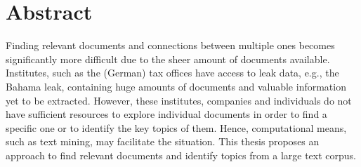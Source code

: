 \chapter*{Abstract}


Finding relevant documents and connections between multiple ones becomes significantly more difficult due to the sheer amount of documents available.
Institutes, such as the (German) tax offices have access to leak data, e.g., the Bahama leak, containing huge amounts of documents and valuable information yet to be extracted.
However, these institutes, companies and individuals do not have sufficient resources to explore individual documents in order to find a specific one or to identify the key topics of them.
Hence, computational means, such as text mining, may facilitate the situation.
This thesis proposes an approach to find relevant documents and identify topics from a large text corpus.
